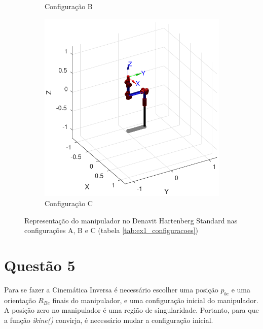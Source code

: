 \documentclass[a4paper,11pt]{article}
\theoremstyle{mytheor}
\begin{document}
\begin{figure}[!ht]
\begin{minipage}{\linewidth}
\begin{subfigure}[b]{0.45\textwidth}
    \caption{Configuração B}
    \end{subfigure}
  \end{minipage}
  \begin{minipage}{\linewidth}
  \centering
    \begin{subfigure}[b]{0.45\textwidth}
    \includegraphics[width=1\textwidth]{figs/ex4_c.pdf}
    \caption{Configuração C}
    \end{subfigure}
  \end{minipage}
\caption{Representação do manipulador no Denavit Hartenberg Standard nas configurações A, B e C (tabela \ref{tab:ex1_configuracoes})}
\label{fig:ex4_configuracoes}
\end{figure}


\section*{Questão 5}

Para se fazer a Cinemática Inversa é necessário escolher uma posição $p_{be} $ e uma orientação $R_{Be}$ finais do manipulador, e uma configuração inicial do manipulador. A posição zero no manipulador é uma região de singularidade. Portanto, para que a função \textit{ikine()} convirja, é necessário mudar a configuração inicial. 
\end{document}
